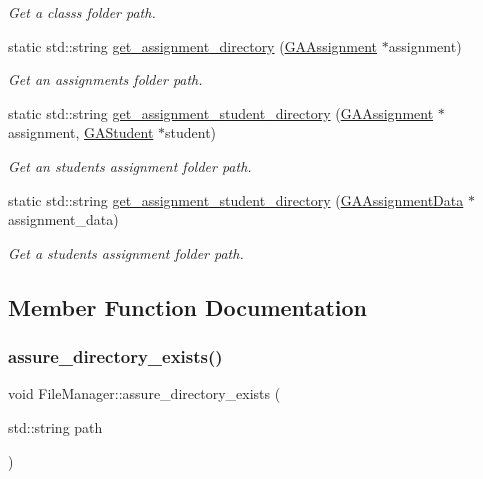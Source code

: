 \begin{DoxyCompactItemize}
\begin{DoxyCompactList}\small\item\em Get a class\textquotesingle{}s folder path. \end{DoxyCompactList}\item 
static std\+::string \hyperlink{class_file_manager_afd38efbb14e09f40b28b9f6b8a0b6c65}{get\+\_\+assignment\+\_\+directory} (\hyperlink{class_g_a_assignment}{G\+A\+Assignment} $\ast$assignment)
\begin{DoxyCompactList}\small\item\em Get an assignment\textquotesingle{}s folder path. \end{DoxyCompactList}\item 
static std\+::string \hyperlink{class_file_manager_a1c8a15a04720ede4792d3ad1b3ed2b07}{get\+\_\+assignment\+\_\+student\+\_\+directory} (\hyperlink{class_g_a_assignment}{G\+A\+Assignment} $\ast$assignment, \hyperlink{class_g_a_student}{G\+A\+Student} $\ast$student)
\begin{DoxyCompactList}\small\item\em Get an student\textquotesingle{}s assignment folder path. \end{DoxyCompactList}\item 
static std\+::string \hyperlink{class_file_manager_abd8c26063a5740fc447fbc8086caef9f}{get\+\_\+assignment\+\_\+student\+\_\+directory} (\hyperlink{class_g_a_assignment_data}{G\+A\+Assignment\+Data} $\ast$assignment\+\_\+data)
\begin{DoxyCompactList}\small\item\em Get a student\textquotesingle{}s assignment folder path. \end{DoxyCompactList}\end{DoxyCompactItemize}


\subsection{Member Function Documentation}
\mbox{\label{class_file_manager_a83cfd6d81f7e28b3e3a0ce2c0304f4d7}} 
\subsubsection{\texorpdfstring{assure\+\_\+directory\+\_\+exists()}{assure\_directory\_exists()}}
{\footnotesize\ttfamily void File\+Manager\+::assure\+\_\+directory\+\_\+exists (\begin{DoxyParamCaption}\item[{std\+::string}]{path }\end{DoxyParamCaption})\hspace{0.3cm}{\ttfamily [static]}}



